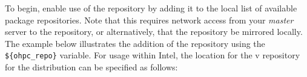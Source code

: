 To begin, enable use of the \OHPC{} repository by adding it to the local list of
available package repositories.  Note that this requires network access from
your {\em master} server to the \OHPC{} repository, or alternatively, that
the \OHPC{} repository be mirrored locally. The example below illustrates the addition
of the \OHPC{} repository using the \texttt{\$\{ohpc\_repo\}}
variable. For usage within Intel, the location for the v\OHPCVersion{}
repository for the \baseOS{} distribution can be specified as follows:






